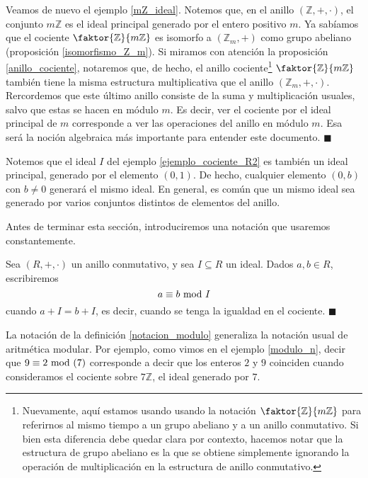 \begin{example} \label{modulo_n}
Veamos de nuevo el ejemplo \ref{mZ_ideal}. Notemos que, en el anillo $(\mathbb{Z}, +, \cdot)$, el conjunto $m\mathbb{Z}$ es el ideal principal generado por el entero positivo $m$. Ya sabíamos que el cociente $\faktor{\mathbb{Z}}{m\mathbb{Z}}$ es isomorfo a $(\mathbb{Z}_m, +)$ como grupo abeliano (proposición \ref{isomorfismo_Z_m}). Si miramos con atención la proposición \ref{anillo_cociente}, notaremos que, de hecho, el anillo cociente\footnote{Nuevamente, aquí estamos usando usando la notación $\faktor{\mathbb{Z}}{m\mathbb{Z}}$ para referirnos al mismo tiempo a un grupo abeliano y a un anillo conmutativo. Si bien esta diferencia debe quedar clara por contexto, hacemos notar que la estructura de grupo abeliano es la que se obtiene simplemente ignorando la operación de multiplicación en la estructura de anillo conmutativo.} $\faktor{\mathbb{Z}}{m\mathbb{Z}}$ también tiene la misma estructura multiplicativa que el anillo $(\mathbb{Z}_m, +, \cdot)$. Rercordemos que este último anillo consiste de la suma y multiplicación usuales, salvo que estas se hacen en módulo $m$. Es decir, ver el cociente por el ideal principal de $m$ corresponde a ver las operaciones del anillo en módulo $m$. Esa será la noción algebraica más importante para entender este documento. \hfill$\blacksquare$
\end{example}

Notemos que el ideal $I$ del ejemplo \ref{ejemplo_cociente_R2} es también un ideal principal, generado por el elemento $(0, 1)$. De hecho, cualquier elemento $(0, b)$ con $b \neq 0$ generará el mismo ideal. En general, es común que un mismo ideal sea generado por varios conjuntos distintos de elementos del anillo.

Antes de terminar esta sección, introduciremos una notación que usaremos constantemente.

\begin{definition} \label{notacion_modulo}
Sea $(R, +, \cdot)$ un anillo conmutativo, y sea $I \subseteq R$ un ideal. Dados $a, b \in R$, escribiremos
$$a \equiv b \!\! \mod I$$
cuando $a + I = b + I$, es decir, cuando se tenga la igualdad en el cociente. \hfill$\blacksquare$
\end{definition}

La notación de la definición \ref{notacion_modulo} generaliza la notación usual de aritmética modular. Por ejemplo, como vimos en el ejemplo \ref{modulo_n}, decir que $9 \equiv 2 \!\! \mod (7)$ corresponde a decir que los enteros $2$ y $9$ coinciden cuando consideramos el cociente sobre $7\mathbb{Z}$, el ideal generado por $7$.

